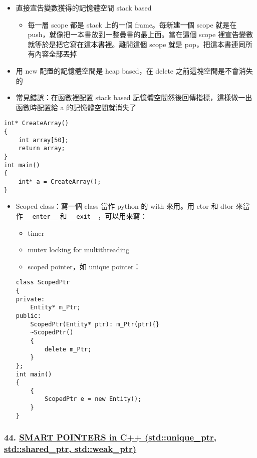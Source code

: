 \documentclass[11pt]{article}
\providecommand{\tightlist}{%
      \setlength{\itemsep}{0pt}\setlength{\parskip}{0pt}}
\begin{document}
\begin{itemize}
\tightlist
\item
  直接宣告變數獲得的記憶體空間 stack based

  \begin{itemize}
  \tightlist
  \item
    每一層 scope 都是 stack 上的一個 frame。每新建一個 scope 就是在
    push，就像把一本書放到一整疊書的最上面。當在這個 scope
    裡宣告變數就等於是把它寫在這本書裡。離開這個 scope 就是
    pop，把這本書連同所有內容全部丟掉
  \end{itemize}
\item
  用 new 配置的記憶體空間是 heap based，在 delete
  之前這塊空間是不會消失的
\item
  常見錯誤：在函數裡配置 stack based
  記憶體空間然後回傳指標，這樣做一出函數時配置給 a 的記憶體空間就消失了
\end{itemize}

\begin{verbatim}
int* CreateArray()
{
    int array[50];
    return array;
}
int main()
{
    int* a = CreateArray();
}
\end{verbatim}

\begin{itemize}
\tightlist
\item
  Scoped class：寫一個 class 當作 python 的 with 來用。用 ctor 和 dtor
  來當作 \texttt{\_\_enter\_\_} 和 \texttt{\_\_exit\_\_}，可以用來寫：

  \begin{itemize}
  \tightlist
  \item
    timer
  \item
    mutex locking for multithreading
  \item
    scoped pointer，如 unique pointer：
  \end{itemize}

\begin{verbatim}
class ScopedPtr
{
private: 
    Entity* m_Ptr;
public: 
    ScopedPtr(Entity* ptr): m_Ptr(ptr){}
    ~ScopedPtr()
    {
        delete m_Ptr;
    }
};
int main()
{
    {
        ScopedPtr e = new Entity();
    }
}
\end{verbatim}
\end{itemize}

\hypertarget{smart-pointers-in-c-stdunique_ptr-stdshared_ptr-stdweak_ptr}{%
\subsubsection{\texorpdfstring{44.
\href{https://www.youtube.com/watch?v=UOB7-B2MfwA\&list=PLlrATfBNZ98dudnM48yfGUldqGD0S4FFb\&index=45\&t=0s}{SMART
POINTERS in C++ (std::unique\_ptr, std::shared\_ptr,
std::weak\_ptr)}}{44. SMART POINTERS in C++ (std::unique\_ptr, std::shared\_ptr, std::weak\_ptr)}}\label{smart-pointers-in-c-stdunique_ptr-stdshared_ptr-stdweak_ptr}}
\end{document}

